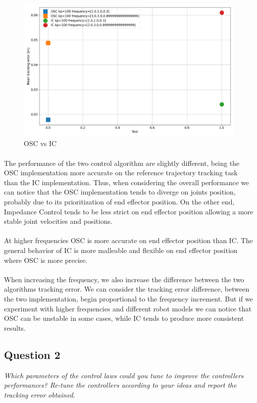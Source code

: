 \documentclass[12pt]{article}
\begin{document}
\begin{figure}[h!]
    \centering
    \includegraphics[width=0.5\linewidth]{images/OSCvsIC.png}
    \caption{OSC vs IC}\label{fig:oscvsic}
\end{figure}

\paragraph*{}
The performance of the two control algorithm are slightly different, being the OSC implementation more accurate on the reference trajectory tracking task than the IC implementation.
Thus, when considering the overall performance we can notice that the OSC implementation tends to diverge on joints position, probably due to its prioritization of end effector position.
On the other end, Impedance Control tends to be less strict on end effector position allowing a more stable joint velocities and positions.

\paragraph*{}
At higher frequencies OSC is more accurate on end effector position than IC. The general behavior of IC is more malleable and flexible on end effector position where OSC is more precise.

\paragraph*{}
When increasing the frequency, we also increase the difference between the two algorithms tracking error. We can consider the tracking error difference, between the two implementation, begin proportional to the frequency increment.
But if we experiment with higher frequencies and different robot models we can notice that OSC can be unstable in some cases, while IC tends to produce more consistent results.


\subsection*{Question 2}
\textit{
    Which parameters of the control laws could you tune to improve the controllers performances?
    Re-tune the controllers according to your ideas and report the tracking error obtained.
}
\end{document}
